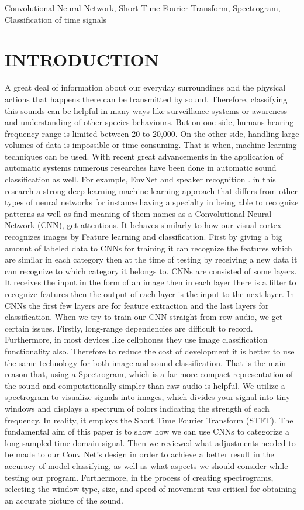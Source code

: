 \documentclass[conference]{IEEEtran}
\begin{document}
\begin{IEEEkeywords}
Convolutional Neural Network, Short Time Fourier Transform, Spectrogram, Classification of time signals
\end{IEEEkeywords}

\section{INTRODUCTION}
A great deal of information about our everyday surroundings and the physical actions that happens there can be transmitted by sound. Therefore, classifying this sounds can be helpful in many ways like surveillance systems or awareness and understanding of other species behaviours. But on one side, humans hearing frequency range is limited between 20 to 20,000. On the other side, handling large volumes of data is impossible or time consuming. That is when, machine learning techniques can be used. With recent great advancements in the application of automatic systems numerous researches have been done in automatic sound classification as well. For example, EnvNet \cite{b1} and speaker recognition \cite{b2}. in this research a strong deep learning machine learning approach that differs from other types of neural networks for instance having a specialty in being able to recognize patterns as well as find meaning of them names as a Convolutional Neural Network (CNN), get attentions. It behaves similarly to how our visual cortex recognizes images by Feature learning and classification. First by giving a big amount of labeled data to CNNs for training it can recognize the features which are similar in each category then at the time of testing by receiving a new data it can recognize to which category it belongs to. CNNs are consisted of some layers. It receives the input in the form of an image then in each layer there is a filter to recognize features then the output of each layer is the input to the next layer. In CNNs the first few layers are for feature extraction and the last layers for classification. 
When we try to train our CNN straight from row audio, we get certain issues. Firstly, long-range dependencies are difficult to record. Furthermore, in most devices like cellphones they use image classification functionality also. Therefore to reduce the cost of development it is better to use the same technology for both image and sound classification. That is the main reason that, using a Spectrogram, which is a far more compact representation of the sound and computationally simpler than raw audio is helpful. We utilize a spectrogram to visualize signals into images, which divides your signal into tiny windows and displays a spectrum of colors indicating the strength of each frequency. In reality, it employs the Short Time Fourier Transform (STFT). The fundamental aim of this paper is to show how we can use CNNs to categorize a long-sampled time domain signal. Then we reviewed what adjustments needed to be made to our Conv Net's design in order to achieve a better result in the accuracy of model classifying, as well as what aspects we should consider while testing our program. Furthermore, in the process of creating spectrograms, selecting the window type, size, and speed of movement was critical for obtaining an accurate picture of the sound.
\end{document}
